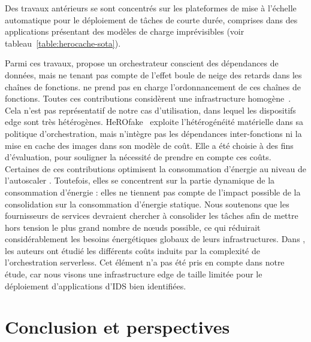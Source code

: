 Des travaux antérieurs se sont concentrés sur les plateformes de mise à l'échelle automatique pour le déploiement de tâches de courte durée, comprises dans des applications présentant des modèles de charge imprévisibles (voir tableau~\ref{table:herocache-sota}).

Parmi ces travaux, \cite{smithFaDOFaaSFunctions2022} propose un orchestrateur conscient des dépendances de données, mais ne tenant pas compte de l'effet boule de neige des retards dans les chaînes de fonctions. \cite{zhangFIRSTExploitingMultiDimensional2023} ne prend pas en charge l'ordonnancement de ces chaînes de fonctions.
Toutes ces contributions considèrent une infrastructure homogène~\cite{bhasiCypressInputSizesensitive2022, zijunFassflowEfficient2022, smithFaDOFaaSFunctions2022, zhangFIRSTExploitingMultiDimensional2023, abdiPaletteLoadBalancing2023}. Cela n'est pas représentatif de notre cas d'utilisation, dans lequel les dispositifs edge sont très hétérogènes. HeROfake~\cite{herofake} exploite l'hétérogénéité matérielle dans sa politique d'orchestration, mais n'intègre pas les dépendances inter-fonctions ni la mise en cache des images dans son modèle de coût. Elle a été choisie à des fins d'évaluation, pour souligner la nécessité de prendre en compte ces coûts.
Certaines de ces contributions optimisent la consommation d'énergie au niveau de l'autoscaler \cite{bhasiCypressInputSizesensitive2022, zhangFIRSTExploitingMultiDimensional2023}. Toutefois, elles se concentrent sur la partie dynamique de la consommation d'énergie : elles ne tiennent pas compte de l'impact possible de la consolidation sur la consommation d'énergie statique. Nous soutenons que les fournisseurs de services devraient chercher à consolider les tâches afin de mettre hors tension le plus grand nombre de nœuds possible, ce qui réduirait considérablement les besoins énergétiques globaux de leurs infrastructures.
Dans \cite{fuerstIluvatarFastControl2023}, les auteurs ont étudié les différents coûts induits par la complexité de l'orchestration serverless. Cet élément n'a pas été pris en compte dans notre étude, car nous visons une infrastructure edge de taille limitée pour le déploiement d'applications d'IDS bien identifiées.

\section{Conclusion et perspectives}
\label{section:herocache-conclusion}


